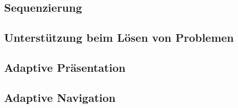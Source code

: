 \subsection{Sequenzierung}

\subsection{Unterstützung beim Lösen von Problemen}

\subsection{Adaptive Präsentation}

\subsection{Adaptive Navigation}

